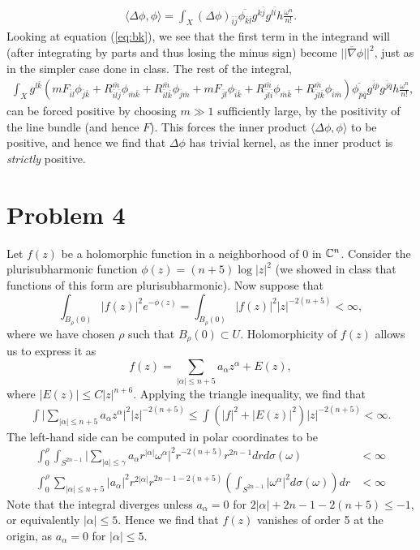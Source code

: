 \documentclass{../mathnotes}
\begin{document}
\begin{enumerate}[(a)]
        \begin{align*}
            \langle \Delta\phi,\phi\rangle=\int_X (\Delta\phi)_{\bar i\bar j}\overline{\phi_{\bar k\bar l}}g^{k\bar j}g^{l\bar i}h\frac{\omega^n}{n!}.
        \end{align*}
        Looking at equation (\ref{eq:bk}), we see that the first term in the integrand will (after integrating by parts and thus losing the minus
        sign) become $||\bar \nabla\phi||^2$, just as in the simpler case done in class. The rest of the integral,
        \begin{align*}
            \int_X g^{l\bar k}\left( mF_{\bar il}\phi_{\bar j\bar k}+R^{\bar m}_{\bar il\bar j}\phi_{\bar m\bar k}+R^{\bar m}_{\bar il\bar k}\phi_{\bar j\bar m}+mF_{\bar jl}\phi_{\bar i\bar k}+R^{\bar m}_{\bar jl\bar i}\phi_{\bar m\bar k}+R^{\bar m}_{\bar jl\bar k}\phi_{\bar i\bar m}\right)\overline{\phi_{\bar p\bar q}}g^{\bar i\bar p}g^{\bar j\bar q}h\frac{\omega^n}{n!},
        \end{align*}
        can be forced positive by choosing $m\gg 1$ sufficiently large, by the positivity of the line bundle (and hence $F$).
        This forces the inner product $\langle\Delta\phi,\phi\rangle$ to be positive, and hence we find that $\Delta\phi$ has trivial
        kernel, as the inner product is \textit{strictly} positive.
\end{enumerate}


\section*{Problem 4}

Let $f(z)$ be a holomorphic function in a neighborhood of $0$ in $\mathbb{C}^n$. Consider the plurisubharmonic function
$\phi(z)=(n+5)\log |z|^2$ (we showed in class that functions of this form are plurisubharmonic). Now suppose
that
\[\int_{B_\rho(0)}|f(z)|^2e^{-\phi(z)}=\int_{B_\rho(0)}|f(z)|^2|z|^{-2(n+5)}<\infty,\]
where we have chosen $\rho$ such that $B_{\rho}(0)\subset U$. Holomorphicity of $f(z)$ allows us to express it as
\[f(z)=\sum_{|\alpha|\leq n+5}a_{\alpha}z^{\alpha}+E(z),\]
where $|E(z)|\leq C|z|^{n+6}$. Applying the triangle inequality, we find that
\begin{align*}
    \int \bigg|\sum_{|\alpha|\leq n+5}a_\alpha z^\alpha\bigg|^2|z|^{-2(n+5)}\leq \int \left( |f|^2+|E(z)|^2 \right)|z|^{-2(n+5)}<\infty.
\end{align*}
The left-hand side can be computed in polar coordinates to be
\begin{align*}
    \int^\rho_0\int_{S^{2n-1}} \bigg|\sum_{|a|\leq \gamma}a_\alpha r^{|\alpha|}\omega^\alpha\bigg|^2 r^{-2(n+5)}r^{2n-1}dr d\sigma(\omega)&<\infty\\
    \int^\rho_0\sum_{|\alpha|\leq n+5}|a_\alpha|^2r^{2|\alpha|}r^{2n-1-2(n+5)}\left( \int_{S^{2n-1}}|\omega^\alpha|^2d\sigma(\omega) \right)dr&<\infty
\end{align*}
Note that the integral diverges unless $a_\alpha=0$ for $2|\alpha|+2n-1-2(n+5)\leq -1$, or equivalently $|\alpha|\leq 5$. Hence we find
that $f(z)$ vanishes of order 5 at the origin, as $a_\alpha=0$ for $|\alpha|\leq 5$.




\end{document}
